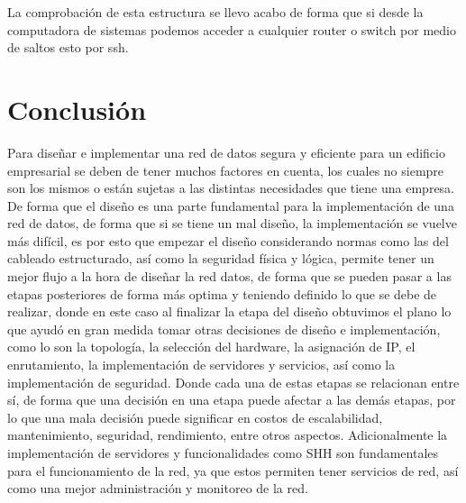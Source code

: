 \documentclass[letterpaper,11pt]{article}
\begin{document}
    La comprobación de esta estructura se llevo acabo de forma que si desde la computadora de sistemas podemos acceder a cualquier router o switch por medio de saltos esto por ssh.

    \section{Conclusión}

    Para diseñar e implementar una red de datos segura y eficiente para un edificio empresarial se deben de tener muchos factores en cuenta, los cuales no siempre son los mismos o están sujetas a las distintas necesidades que tiene una empresa. De forma que el diseño es una parte fundamental para la implementación de una red de datos, de forma que si se tiene un mal diseño, la implementación se vuelve más difícil, es por esto que empezar el diseño considerando normas como las del cableado estructurado, así como la seguridad física y lógica, permite tener un mejor flujo a la hora de diseñar la red datos, de forma que se pueden pasar a las etapas posteriores de forma más optima y teniendo definido lo que se debe de realizar, donde en este caso al finalizar la etapa del diseño obtuvimos el plano lo que ayudó en gran medida tomar otras decisiones de diseño e implementación, como lo son la topología, la selección del hardware, la asignación de IP, el enrutamiento, la implementación de servidores y servicios, así como la implementación de seguridad. Donde cada una de estas etapas se relacionan entre sí, de forma que una decisión en una etapa puede afectar a las demás etapas, por lo que una mala decisión puede significar en costos de escalabilidad, mantenimiento, seguridad, rendimiento, entre otros aspectos. Adicionalmente la implementación de servidores y funcionalidades como SHH son fundamentales para el funcionamiento de la red, ya que estos permiten tener servicios de red, así como una mejor administración y monitoreo de la red.


    \newpage

    \thispagestyle{empty}
    
    \nocite{*}
    \printbibliography[heading=bibintoc, title={Referencias}]
\end{document}
